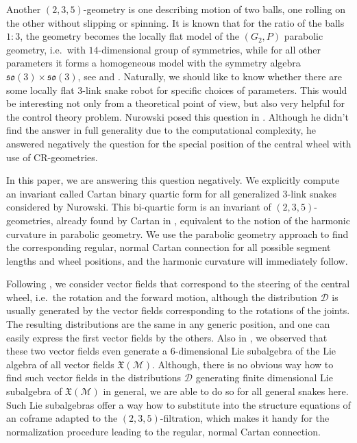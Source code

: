 \documentclass{amsart}
\theoremstyle{plain}
\theoremstyle{definition}
\theoremstyle{remark}
\newcommand{\mc}[1]{\mathcal{#1}}
\newcommand{\mfk}[1]{\mathfrak{#1}}
\begin{document}
Another $(2,3,5)$-geometry is one describing motion of two balls, one rolling on the other without slipping or spinning. It is known that for the ratio of the balls $1:3$, the geometry becomes the locally flat model of the $(G_2,P)$ parabolic geometry, i.e.~with $14$-dimensional group of symmetries, while for all other parameters it forms a homogeneous model with the symmetry algebra $\mfk{so}(3)\times \mfk{so}(3)$, see \cite[p.~16]{dt2022} and \cite{gb2009}. Naturally, we should like to know whether there are some locally flat $3$-link snake robot for specific choices of parameters. This would be interesting not only from a theoretical point of view, but also very helpful for the control theory problem. Nurowski posed this question in \cite{pn2014}. Although he didn't find the answer in full generality due to the computational complexity, he answered negatively the question for the special position of the central wheel with use of CR-geometries.

In this paper, we are answering this question negatively. We explicitly compute an invariant called Cartan binary quartic form for all generalized $3$-link snakes considered by Nurowski. This bi-quartic form is an invariant of $(2,3,5)$-geometries, already found by Cartan in \cite{ec1910}, equivalent to the notion of the harmonic curvature in parabolic geometry. We use the parabolic geometry approach to find the corresponding regular, normal Cartan connection for all possible segment lengths and wheel positions, and the harmonic curvature will immediately follow.

Following \cite{md2024}, we consider vector fields that correspond to the steering of the central wheel, i.e.~the rotation and the forward motion, although the distribution $\mc{D}$ is usually generated by the vector fields corresponding to the rotations of the joints. The resulting distributions are the same in any generic position, and one can easily express the first vector fields by the others. Also in \cite{md2024}, we observed that these two vector fields even generate a $6$-dimensional Lie subalgebra of the Lie algebra of all vector fields $\mfk{X}(\mc{M})$. Although, there is no obvious way how to find such vector fields in the distributions $\mc{D}$ generating finite dimensional Lie subalgebra of $\mfk{X}(\mc{M})$ in general, we are able to do so for all general snakes here. Such Lie subalgebras offer a way how to substitute into the structure equations of an coframe adapted to the $(2,3,5)$-filtration, which makes it handy for the normalization procedure leading to the regular, normal Cartan connection.
\end{document}
